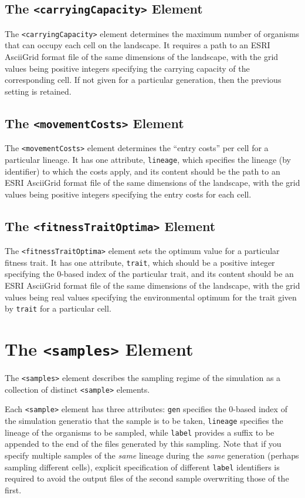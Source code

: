 \documentclass[11pt]{article}
\newcommand{\xmlelem}[1]{{\tt<\textcolor{xmlelem}{#1}>}}
\newcommand{\xmlattr}[1]{{\tt\textcolor{xmlattr}{#1}}}
\begin{document}
\subsection{The \xmlelem{carryingCapacity} Element}

The \xmlelem{carryingCapacity} element determines the maximum number of organisms that can occupy each cell on the landscape. It requires a path to an ESRI AsciiGrid format file of the same dimensions of the landscape, with the grid values being positive integers specifying the carrying capacity of the corresponding cell. If not given for a particular generation, then the previous setting is retained.

\subsection{The \xmlelem{movementCosts} Element}

The \xmlelem{movementCosts} element determines the ``entry costs'' per cell for a particular lineage. It has one attribute, \xmlattr{lineage}, which specifies the lineage (by identifier) to which the costs apply, and its content should be the path to an ESRI AsciiGrid format file of the same dimensions of the landscape, with the grid values being positive integers specifying the entry costs for each cell.

\subsection{The \xmlelem{fitnessTraitOptima} Element}

The \xmlelem{fitnessTraitOptima} element sets the optimum value for a particular fitness trait. It has one attribute, \xmlattr{trait}, which should be a positive integer specifying the 0-based index of the particular trait, and its content should be an ESRI AsciiGrid format file of the same dimensions of the landscape, with the grid values being real values specifying the environmental optimum for the trait given by \xmlattr{trait} for a particular cell.

\section{The \xmlelem{samples} Element}

The \xmlelem{samples} element describes the sampling regime of the simulation as a collection of distinct \xmlelem{sample} elements.

Each \xmlelem{sample} element has three attributes: \xmlattr{gen} specifies the 0-based index of the simulation generatio that the sample is to be taken, \xmlattr{lineage} specifies the lineage of the organisms to be sampled, while \xmlattr{label} provides a suffix to be appended to the end of the files generated by this sampling.
Note that if you specify multiple samples of the \textit{same} lineage during the \textit{same} generation (perhaps sampling different cells), explicit specification of different \xmlattr{label} identifiers is required to avoid the output files of the second sample overwriting those of the first.
\end{document}
